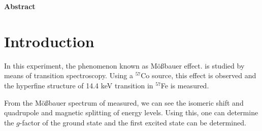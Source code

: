 \documentclass[a4paper]{report}
\numberwithin{equation}{section}
\begin{document}
\begin{titlepage}
	\vspace*{5em}

	\begin{minipage}{0.8\textwidth}
		\begin{centering}
			\textbf{Abstract}\\[0.2cm]

		\end{centering}
	\end{minipage}
	
	
	
	
	
	
	 
	
	
\end{titlepage}



\tableofcontents

\chapter{Introduction}

In this experiment, the phenomenon known as M\"o{\ss}bauer effect. is studied by means of transition spectroscopy. Using a $^{57}$Co source, this effect is observed and the hyperfine structure of 14.4 keV transition in $^{57}$Fe is measured. 

From the M\"o{\ss}bauer spectrum of measured, we can see the isomeric shift and quadrupole and magnetic splitting of energy levels. Using this, one can determine the $g$-factor of the ground state and the first excited state can be determined. 
\end{document}
